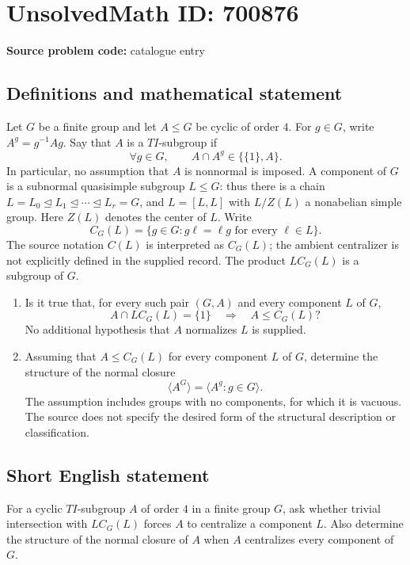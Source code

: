 \documentclass[11pt]{article}
\begin{document}
\section*{UnsolvedMath ID: 700876}
\textbf{Source problem code:} catalogue entry
\subsection{Definitions and mathematical statement}
Let \(G\) be a finite group and let \(A\leq G\) be cyclic of order \(4\). For \(g\in G\), write \(A^g=g^{-1}Ag\). Say that \(A\) is a \(TI\)-subgroup if
\[
\forall g\in G,\qquad A\cap A^g\in\{\{1\},A\}.
\]
In particular, no assumption that \(A\) is nonnormal is imposed. A component of \(G\) is a subnormal quasisimple subgroup \(L\leq G\): thus there is a chain \(L=L_0\trianglelefteq L_1\trianglelefteq\cdots\trianglelefteq L_r=G\), and \(L=[L,L]\) with \(L/Z(L)\) a nonabelian simple group. Here \(Z(L)\) denotes the center of \(L\). Write
\[
C_G(L)=\{g\in G: g\ell=\ell g\text{ for every }\ell\in L\}.
\]
The source notation \(C(L)\) is interpreted as \(C_G(L)\); the ambient centralizer is not explicitly defined in the supplied record. The product \(LC_G(L)\) is a subgroup of \(G\).

\begin{enumerate}
\item[(a)] Is it true that, for every such pair \((G,A)\) and every component \(L\) of \(G\),
\[
A\cap LC_G(L)=\{1\}\quad\Longrightarrow\quad A\leq C_G(L)?
\]
No additional hypothesis that \(A\) normalizes \(L\) is supplied.
\item[(b)] Assuming that \(A\leq C_G(L)\) for every component \(L\) of \(G\), determine the structure of the normal closure
\[
\langle A^G\rangle=\bigl\langle A^g:g\in G\bigr\rangle.
\]
The assumption includes groups with no components, for which it is vacuous. The source does not specify the desired form of the structural description or classification.
\end{enumerate}
\subsection{Short English statement}
For a cyclic \(TI\)-subgroup \(A\) of order \(4\) in a finite group \(G\), ask whether trivial intersection with \(LC_G(L)\) forces \(A\) to centralize a component \(L\). Also determine the structure of the normal closure of \(A\) when \(A\) centralizes every component of \(G\).
\end{document}
